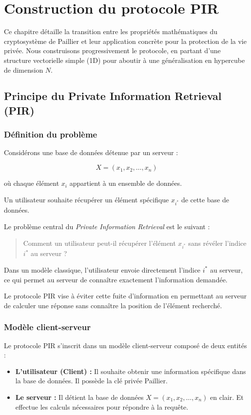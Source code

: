 \documentclass[12pt,a4paper]{report}
\begin{document}
\chapter{Construction du protocole PIR}

Ce chapitre détaille la transition entre les propriétés mathématiques du cryptosystème de Paillier et leur application concrète pour la protection de la vie privée. Nous construisons progressivement le protocole, en partant d'une structure vectorielle simple (1D) pour aboutir à une généralisation en hypercube de dimension $N$.

\section{Principe du Private Information Retrieval (PIR)}


\subsection{Définition du problème}

Considérons une base de données détenue par un serveur :

\[
X = (x_1, x_2, \dots , x_n)
\]

où chaque élément $x_i$ appartient à un ensemble de données.

Un utilisateur souhaite récupérer un élément spécifique $x_{i^*}$ de cette base de données.

Le problème central du \textit{Private Information Retrieval} est le suivant :

\begin{quote}
Comment un utilisateur peut-il récupérer l'élément $x_{i^*}$ sans révéler l'indice $i^*$ au serveur ?
\end{quote}

Dans un modèle classique, l'utilisateur envoie directement l'indice $i^*$ au serveur, ce qui permet au serveur de connaître exactement l'information demandée.

Le protocole PIR vise à éviter cette fuite d'information en permettant au serveur de calculer une réponse sans connaître la position de l'élément recherché.


\subsection{Modèle client-serveur}
Le protocole PIR s'inscrit dans un modèle client-serveur composé de deux entités :
\begin{itemize}
    \item \textbf{L'utilisateur (Client) :} Il souhaite obtenir une information spécifique dans la base de données. 
    Il possède la clé privée Paillier. 
    \item \textbf{Le serveur :} Il détient la base de données $X = (x_1, x_2, \dots, x_n)$ en clair. Et effectue les calculs nécessaires pour répondre à la requête.
\end{itemize}
\end{document}
